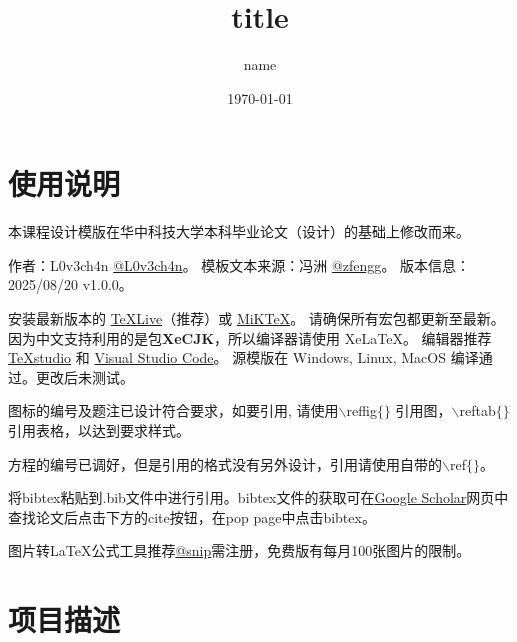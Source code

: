 \documentclass[a4paper]{article}
\title{title}
\author{name}
\date{\today}
\begin{document}
\maketitle
\begin{spacing}{1.2}%
    \tableofcontents
\end{spacing}
\thispagestyle{main}

\clearpage
\setcounter{page}{1}
\renewcommand{\thepage}{\arabic{page}}
\section{使用说明}\seccontent
\begin{description}
	\seccontent
    \item[模版来源] 
    本课程设计模版在华中科技大学本科毕业论文（设计）的基础上修改而来。
	\item[源模版信息] 
    作者：L0v3ch4n \href{https://github.com/Cuber-Wei}{@L0v3ch4n}。
    模板文本来源：冯洲 \href{https://github.com/zfengg}{@zfengg}。
    版本信息：2025/08/20 v1.0.0。
	\item[本地编译条件]  
    安装最新版本的 \href{http://www.tug.org/texlißve/}{TeXLive}（推荐）或 \href{http://miktex.org/}{MiKTeX}。
    请确保所有宏包都更新至最新。因为中文支持利用的是包\textbf{XeCJK}，所以编译器请使用 Xe\LaTeX。 
    编辑器推荐 \href{http://texstudio.sourceforge.net/}{TeXstudio} 和 \href{https://code.visualstudio.com/}{Visual Studio Code}。 
    源模版在 Windows, Linux, MacOS 编译通过。更改后未测试。
	\item[图表引用] 图标的编号及题注已设计符合要求，如要引用, 请使用$\backslash$reffig$\lbrace\rbrace$ 引用图，$\backslash$reftab$\lbrace\rbrace$引用表格，以达到要求样式。
	\item[公式交叉引用] 方程的编号已调好，但是引用的格式没有另外设计，引用请使用自带的$\backslash$ref$\lbrace\rbrace$。
	\item[参考文献] 将bibtex粘贴到.bib文件中进行引用。bibtex文件的获取可在\href{https://scholar.google.com}{Google Scholar}网页中查找论文后点击下方的cite按钮，在pop page中点击bibtex。
    \item[LaTeX公式转换] 图片转LaTeX公式工具推荐\href{https://snip.mathpix.com}{@snip}需注册，免费版有每月100张图片的限制。

\end{description}

\section{项目描述}
\end{document}
